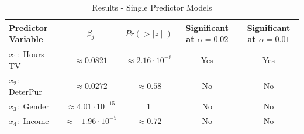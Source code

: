 \documentclass[10pt, oneside,spanish]{article}
\begin{document}






\begin{table}[ht]
\caption{ Results - Single Predictor Models} %
\centering %
\begin{tabular}{l c c c c} %
\hline\hline %
Predictor Variable & $\beta_j $ & \textbf{$Pr(>\mid z \mid )$} & Significant at $\alpha = 0.02$ & Significant at $\alpha = 0.01$ \\ [1.5ex] %
\hline %
$x_1:$ Hours TV  &  $\approx 0.0821  $ & $ \approx 2.16 \cdot 10^{-8}$ & Yes & Yes \\ %
$x_2: $ DeterPur  &  $\approx 0.0272  $ & $ \approx 0.58$ & No & No \\
$x_3:$  Gender &  $\approx 4.01 \cdot 10^{-15} $ & $1$ & No & No  \\
$x_4:$  Income  &  $\approx -1.96 \cdot 10^{-5} $& $ \approx 0.72$ & No & No   \\[1ex] %
\hline %
\end{tabular}
\label{table:singpred} %
\end{table}
\end{document}

